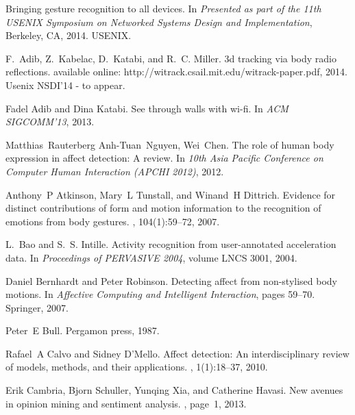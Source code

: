 \documentclass[12pt]{article}
\begin{document}
\begin{thebibliography}{10}

Bringing gesture recognition to all devices.
\newblock In {\em Presented as part of the 11th USENIX Symposium on Networked
  Systems Design and Implementation}, Berkeley, CA, 2014. USENIX.

F.~Adib, Z.~Kabelac, D.~Katabi, and R.~C. Miller.
\newblock 3d tracking via body radio reflections.
\newblock available online: http://witrack.csail.mit.edu/witrack-paper.pdf,
  2014.
\newblock Usenix NSDI’14 - to appear.

Fadel Adib and Dina Katabi.
\newblock See through walls with wi-fi.
\newblock In {\em ACM SIGCOMM'13}, 2013.

Matthias~Rauterberg Anh-Tuan~Nguyen, Wei~Chen.
\newblock The role of human body expression in affect detection: A review.
\newblock In {\em 10th Asia Pacific Conference on Computer Human Interaction
  (APCHI 2012)}, 2012.

Anthony~P Atkinson, Mary~L Tunstall, and Winand~H Dittrich.
\newblock Evidence for distinct contributions of form and motion information to
  the recognition of emotions from body gestures.
, 104(1):59--72, 2007.

L.~Bao and S.~S. Intille.
\newblock Activity recognition from user-annotated acceleration data.
\newblock In {\em Proceedings of PERVASIVE 2004}, volume LNCS 3001, 2004.

Daniel Bernhardt and Peter Robinson.
\newblock Detecting affect from non-stylised body motions.
\newblock In {\em Affective Computing and Intelligent Interaction}, pages
  59--70. Springer, 2007.

Peter~E Bull.
\newblock Pergamon press, 1987.

Rafael~A Calvo and Sidney D'Mello.
\newblock Affect detection: An interdisciplinary review of models, methods, and
  their applications.
, 1(1):18--37, 2010.

Erik Cambria, Bjorn Schuller, Yunqing Xia, and Catherine Havasi.
\newblock New avenues in opinion mining and sentiment analysis.
, page~1, 2013.


\end{thebibliography}
\end{document}
